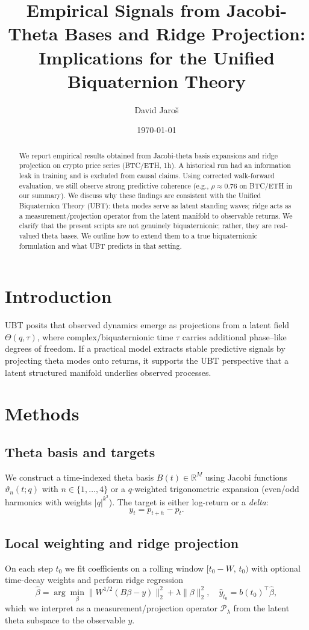 \documentclass[11pt,a4paper]{article}
\title{Empirical Signals from Jacobi-Theta Bases and Ridge Projection:\\
Implications for the Unified Biquaternion Theory}
\author{David Jaro\v{s}}
\date{\today}
\begin{document}
\maketitle

\begin{abstract}
We report empirical results obtained from Jacobi-theta basis expansions and ridge projection on crypto price series (BTC/ETH, 1h). A historical run had an information leak in training and is excluded from causal claims. Using corrected walk-forward evaluation, we still observe strong predictive coherence (e.g., $\rho \approx 0.76$ on BTC/ETH in our summary). We discuss why these findings are consistent with the Unified Biquaternion Theory (UBT): theta modes serve as latent standing waves; ridge acts as a measurement/projection operator from the latent manifold to observable returns. We clarify that the present scripts are not genuinely biquaternionic; rather, they are real-valued theta bases. We outline how to extend them to a true biquaternionic formulation and what UBT predicts in that setting.
\end{abstract}

\section{Introduction}
UBT posits that observed dynamics emerge as projections from a latent field $\Theta(q,\tau)$, where complex/biquaternionic time $\tau$ carries additional phase--like degrees of freedom. If a practical model extracts stable predictive signals by projecting theta modes onto returns, it supports the UBT perspective that a latent structured manifold underlies observed processes.

\section{Methods}
\subsection{Theta basis and targets}
We construct a time-indexed theta basis $B(t)\in\mathbb{R}^{M}$ using Jacobi functions $\vartheta_n(t;q)$ with $n\in\{1,\ldots,4\}$ or a $q$-weighted trigonometric expansion (even/odd harmonics with weights $\lvert q\rvert^{k^2}$). The target is either log-return or a \emph{delta}:
\[
y_t = p_{t+h}-p_t.
\]

\subsection{Local weighting and ridge projection}
On each step $t_0$ we fit coefficients on a rolling window $[t_0-W,\,t_0)$ with optional time-decay weights and perform ridge regression
\[
\hat{\beta}=\arg\min_\beta \|W^{1/2}(B\beta - y)\|_2^2 + \lambda\|\beta\|_2^2,
\quad
\hat{y}_{t_0} = b(t_0)^\top \hat{\beta},
\]
which we interpret as a measurement/projection operator $\mathcal{P}_\lambda$ from the latent theta subspace to the observable $y$.
\end{document}
